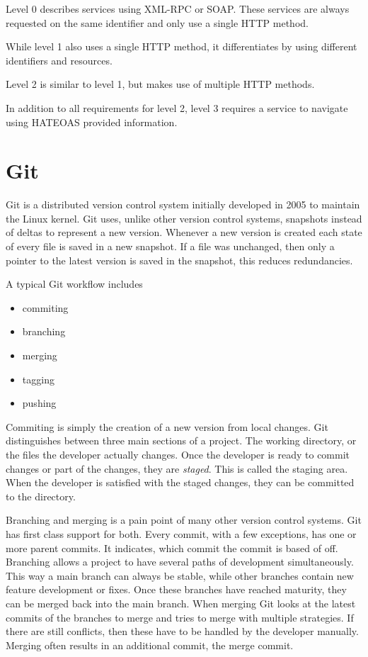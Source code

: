 Level 0 describes services using XML-RPC or SOAP. These services are always
requested on the same identifier and only use a single HTTP method.

While level 1 also uses a single HTTP method, it differentiates by using
different identifiers and resources.

Level 2 is similar to level 1, but makes use of multiple HTTP methods.

In addition to all requirements for level 2, level 3 requires a service to
navigate using HATEOAS provided information.

\section{Git}

Git is a distributed version control system initially developed in 2005 to
maintain the Linux kernel. Git uses, unlike other version control systems,
snapshots instead of deltas to represent a new version. Whenever a new version
is created each state of every file is saved in a new snapshot. If a file was
unchanged, then only a pointer to the latest version is saved in the snapshot,
this reduces redundancies.

A typical Git workflow includes

\begin{itemize}
  \item{commiting}
  \item{branching}
  \item{merging}
  \item{tagging}
  \item{pushing}
\end{itemize}

Commiting is simply the creation of a new version from local changes. Git
distinguishes between three main sections of a project. The working directory,
or the files the developer actually changes. Once the developer is ready to
commit changes or part of the changes, they are \textit{staged}. This is called
the staging area. When the developer is satisfied with the staged changes,
they can be committed to the directory.

Branching and merging is a pain point of many other version control systems. Git
has first class support for both. Every commit, with a few exceptions, has one
or more parent commits. It indicates, which commit the commit is based of off.
Branching allows a project to have several paths of development simultaneously.
This way a main branch can always be stable, while other branches contain new
feature development or fixes. Once these branches have reached maturity, they
can be merged back into the main branch. When merging Git looks at the latest
commits of the branches to merge and tries to merge with multiple strategies.
If there are still conflicts, then these have to be handled by the developer
manually. Merging often results in an additional commit, the merge commit.

